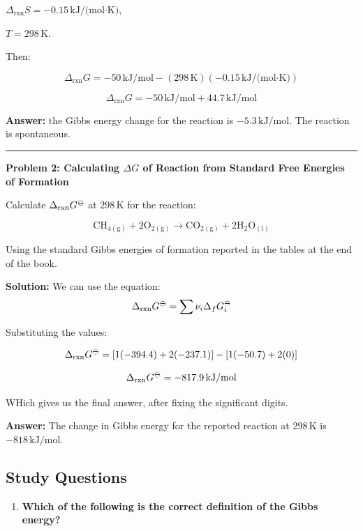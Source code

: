 \documentclass[
  9pt,
]{extbook}
\providecommand{\tightlist}{%
  \setlength{\itemsep}{0pt}\setlength{\parskip}{0pt}}
\theoremstyle{definition}
\theoremstyle{definition}
\theoremstyle{definition}
\theoremstyle{definition}
\theoremstyle{remark}
\begin{document}
\(\Delta_{\text{rxn}} S = -0.15\,\text{kJ/(mol·K)}\),

\(T=298\,\text{K}\).

Then:

\[\Delta_{\text{rxn}} G = -50\,\text{kJ/mol} - (298\,\text{K})(-0.15\,\text{kJ/(mol·K)})\]

\[\Delta_{\text{rxn}} G = -50\,\text{kJ/mol} + 44.7\,\text{kJ/mol}\]

\textbf{Answer:} the Gibbs energy change for the reaction is \(-5.3\,\text{kJ/mol}\). The reaction is spontaneous.

\begin{center}\rule{0.5\linewidth}{0.5pt}\end{center}

\textbf{Problem 2: Calculating \(\Delta G\) of Reaction from Standard Free Energies of Formation}

Calculate \(\Delta_{\text{rxn}}G^{{-\kern-6pt{\ominus}\kern-6pt-}}\) at \(298\,\text{K}\) for the reaction:

\[\text{CH}_{4(\text{g})} + 2\text{O}_{2(\text{g})} \rightarrow \text{CO}_{2(\text{g})} + 2\text{H}_{2}\text{O}_{(\text{l})}\]

Using the standard Gibbs energies of formation reported in the tables at the end of the book.

\textbf{Solution:} We can use the equation: \[\Delta_{\text{rxn}}G^{{-\kern-6pt{\ominus}\kern-6pt-}} = \sum \nu_i \Delta_f G^{{-\kern-6pt{\ominus}\kern-6pt-}}_i \]

Substituting the values:

\[\Delta_{\text{rxn}}G^{{-\kern-6pt{\ominus}\kern-6pt-}} = [1(-394.4) + 2(-237.1)] - [1(-50.7) + 2(0)]\]

\[\Delta_{\text{rxn}}G^{{-\kern-6pt{\ominus}\kern-6pt-}} = -817.9\,\text{kJ/mol}\]

WHich gives us the final answer, after fixing the significant digits.

\textbf{Answer:} The change in Gibbs energy for the reported reaction at \(298\,\text{K}\) is \(-818\,\text{kJ/mol}\).

\subsection{Study Questions}\label{quest9}

\begin{enumerate}
\def\labelenumi{\arabic{enumi}.}
\tightlist
\item
  \textbf{Which of the following is the correct definition of the Gibbs energy?}
\end{enumerate}
\end{document}
